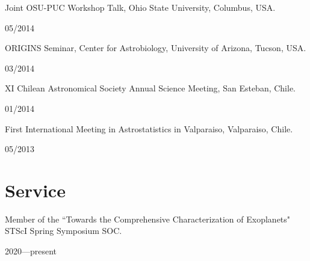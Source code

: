 \documentclass[12pt, a4paper]{article} %
\begin{document}
\begin{minipage}[t]{0.7\textwidth}
\begin{flushleft}%
  \setlength{\leftskip}{0.2cm}%
Joint OSU-PUC Workshop Talk, Ohio State University, Columbus, USA.
\end{flushleft}
\end{minipage}
\begin{minipage}[t]{0.3\textwidth}
\hfill 05/2014
\end{minipage}
\vspace{0.2cm}

\begin{minipage}[t]{0.7\textwidth}
\begin{flushleft}%
  \setlength{\leftskip}{0.2cm}%
ORIGINS Seminar, Center for Astrobiology, University of Arizona, Tucson, USA.
\end{flushleft}
\end{minipage}
\begin{minipage}[t]{0.3\textwidth}
\hfill 03/2014
\end{minipage}
\vspace{0.2cm}

\begin{minipage}[t]{0.7\textwidth}
\begin{flushleft}%
  \setlength{\leftskip}{0.2cm}%
XI Chilean Astronomical Society Annual Science Meeting, San Esteban, Chile.
\end{flushleft}
\end{minipage}
\begin{minipage}[t]{0.3\textwidth}
\hfill 01/2014
\end{minipage}
\vspace{0.2cm}

\begin{minipage}[t]{0.7\textwidth}
\begin{flushleft}%
  \setlength{\leftskip}{0.2cm}%
First International Meeting in Astrostatistics in Valparaiso, Valparaiso, Chile. 
\end{flushleft}
\end{minipage}
\begin{minipage}[t]{0.3\textwidth}
\hfill 05/2013
\end{minipage}

\section*{Service}

\begin{minipage}[t]{0.7\textwidth}
\begin{flushleft}%
  \setlength{\leftskip}{0.2cm}%
Member of the ``Towards the Comprehensive Characterization of Exoplanets" STScI Spring Symposium SOC.
\end{flushleft}
\end{minipage}
\begin{minipage}[t]{0.3\textwidth}
\hfill 2020---present
\end{minipage}
\end{document}
